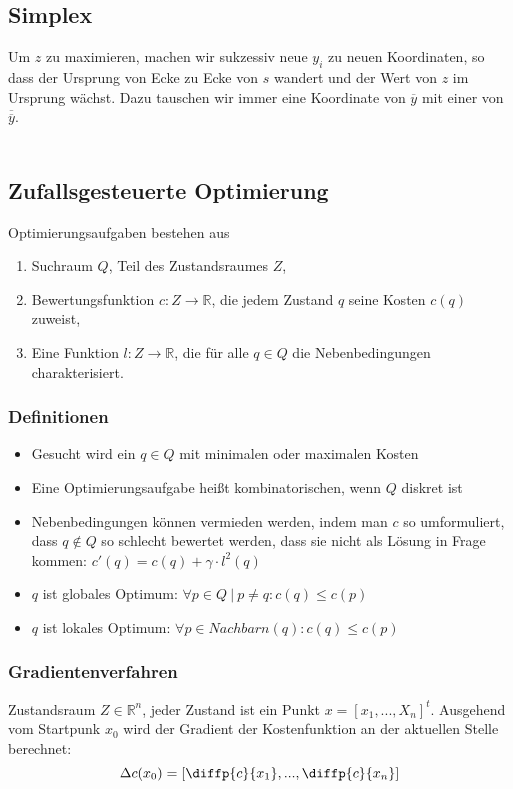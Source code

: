 \subsection{Simplex}
Um \(z\) zu maximieren, machen wir sukzessiv neue \(y_i\) zu neuen Koordinaten, so dass der Ursprung von Ecke zu Ecke von \(s\) wandert und der Wert von \(z\) im Ursprung wächst. Dazu tauschen wir immer eine Koordinate von \(\overline{y}\) mit einer von \(\overline{\overline{y}}\).
\text{}\\

\text{}\\



\subsection{Zufallsgesteuerte Optimierung}
Optimierungsaufgaben bestehen aus 
\begin{enumerate}
	\item Suchraum $Q$, Teil des Zustandsraumes $Z$,
	\item Bewertungsfunktion $c: Z \rightarrow \mathbb{R}$, die jedem Zustand $q$ seine Kosten $c(q)$ zuweist,
	\item Eine Funktion $l: Z \rightarrow \mathbb{R}$, die für alle $q \in Q$ die Nebenbedingungen charakterisiert.
\end{enumerate}

\subsubsection{Definitionen}
\begin{itemize}
	\item Gesucht wird ein \(q \in Q\) mit minimalen oder maximalen Kosten
	\item Eine Optimierungsaufgabe heißt kombinatorischen, wenn \(Q\) diskret ist
	\item Nebenbedingungen können vermieden werden, indem man \(c\) so umformuliert, dass \(q \not\in Q\) so schlecht bewertet werden, dass sie nicht als Lösung in Frage kommen: \(c'(q) = c(q) + \gamma \cdot l^2(q)\)
	\item \(q\) ist globales Optimum: \(\forall p \in Q~|~p \ne q: c(q) \le c(p)\)
	\item \(q\) ist lokales Optimum: \(\forall p \in Nachbarn(q): c(q) \le c(p)\)
\end{itemize}

\subsubsection{Gradientenverfahren}
Zustandsraum \(Z \in \mathbb{R}^n\), jeder Zustand ist ein Punkt \(x = [x_1, ... , X_n]^t\).
Ausgehend vom Startpunk $x_0$ wird der Gradient der Kostenfunktion an der aktuellen Stelle berechnet:
\[\Delta c(x_0) = \left[ \diffp{c}{{x_{1}}}, ... , \diffp{c}{{x_{n}}} \right]\]

